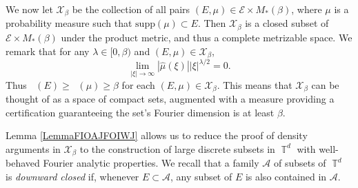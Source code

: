\documentclass[dvipsnames,letterpaper,12pt]{article}
\numberwithin{equation}{section}
\DeclareMathOperator{\fordim}{\dim_{\mathbb{F}}}
\DeclareMathOperator{\TT}{\mathbb{T}}
\newtheorem{theorem}{Theorem}
\numberwithin{theorem}{section}
\begin{document}
We now let $\mathcal{X}_\beta$ be the collection of all pairs $(E,\mu) \in \mathcal{E} \times M_*(\beta)$, where $\mu$ is a probability measure such that $\text{supp}(\mu) \subset E$. Then $\mathcal{X}_\beta$ is a closed subset of $\mathcal{E} \times M_*(\beta)$ under the product metric, and thus a complete metrizable space. We remark that for any $\lambda \in [0,\beta)$ and $(E,\mu) \in \mathcal{X}_\beta$,
%
\begin{equation} \label{equationGFSCSC4}
    \lim_{|\xi| \to \infty} |\widehat{\mu}(\xi)| |\xi|^{\lambda/2} = 0.
\end{equation}
%
Thus $\fordim(E) \geq \fordim(\mu) \geq \beta$ for each $(E,\mu) \in \mathcal{X}_\beta$. This means that $\mathcal{X}_\beta$ can be thought of as a space of compact sets, augmented with a measure providing a certification guaranteeing the set's Fourier dimension is at least $\beta$.

\begin{comment}
\begin{theorem}
    $\mathcal{X}$ is a closed subset of $\mathcal{E} \times M(\beta)$.
\end{theorem}
\begin{proof}
    Suppose $\{ (E_k,\mu_k) \}$ is a sequence of elements of $\mathcal{X}$ converging to some tuple $(E,\mu) \in \mathcal{E} \times M(\beta)$. Fix $\varepsilon > 0$. Since $E_k \to E$ in the Hausdorff dimension, there exists $k_0$ such that for $k \geq k_0$, $E_k \subset E(\varepsilon)$. Since $\mu_k \to \mu$ weakly, this implies that $\mu$ is a probability measure, and that $\text{supp}(\mu) \subset E(\varepsilon)$. Taking $\varepsilon \to 0$ shows that $\text{supp}(\mu) \subset E$. Again for a fixed $\varepsilon > 0$, applying the triangle inequality and the reverse triangle inequality combined with \eqref{equationGFSCSC4} applied to $\mu_k$, we conclude
    \[ \lim_{|\xi| \to \infty} |\xi|^{\beta/2 - \varepsilon} |\widehat{\mu}(\xi)| = \lim_{|\xi| \to \infty} |\xi|^{\beta/2 - \varepsilon} |\widehat{\mu}(\xi) - \widehat{\mu_k}(\xi)| \leq \| \mu - \mu_k \|_{M(\beta,\varepsilon)}. \]
    Taking $k \to \infty$ shows that
    \[ \lim_{|\xi| \to \infty} |\xi|^{\beta/2 - \varepsilon} |\widehat{\mu}(\xi)| = 0, \]
    which completes the proof.
\end{proof}
\end{comment}

Lemma \ref{LemmaFIOAJFOIWJ} allows us to reduce the proof of density arguments in $\mathcal{X}_\beta$ to the construction of large discrete subsets in $\TT^d$ with well-behaved Fourier analytic properties. We recall that a family $\mathcal{A}$ of subsets of $\TT^d$ is \emph{downward closed} if, whenever $E \subset \mathcal{A}$, any subset of $E$ is also contained in $\mathcal{A}$.
\end{document}
